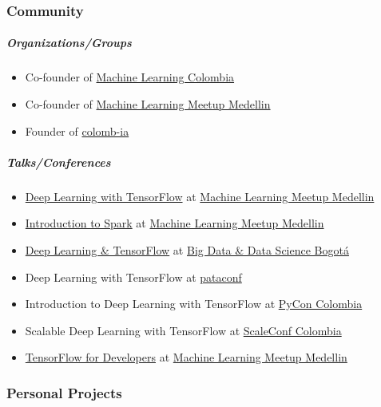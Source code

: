 \documentclass[]{article}
\begin{document}
\subsubsection{Community}\label{community}

\subparagraph{Organizations/Groups}\label{organizationsgroups}

\begin{itemize}
\itemsep1pt\parskip0pt
\item
  Co-founder of
  \href{https://www.facebook.com/groups/1766056600304468}{Machine
  Learning Colombia}
\item
  Co-founder of \href{https://www.meetup.com/es-ES/ml-medellin}{Machine
  Learning Meetup Medellin}
\item
  Founder of
  \href{https://github.com/colomb-ia/mision-vision}{colomb-ia}
\end{itemize}

\subparagraph{Talks/Conferences}\label{talksconferences}

\begin{itemize}
\itemsep1pt\parskip0pt
\item
  \href{https://www.meetup.com/es-ES/ml-medellin/events/231887878/}{Deep
  Learning with TensorFlow} at
  \href{https://www.meetup.com/es-ES/ml-medellin}{Machine Learning
  Meetup Medellin}
\item
  \href{https://www.meetup.com/es-ES/ml-medellin/events/232587669/}{Introduction
  to Spark} at \href{https://www.meetup.com/es-ES/ml-medellin}{Machine
  Learning Meetup Medellin}
\item
  \href{https://www.meetup.com/es-ES/Big-Data-Science-Bogota/events/233975872}{Deep
  Learning \& TensorFlow} at
  \href{https://www.meetup.com/es-ES/Big-Data-Science-Bogota/}{Big Data
  \& Data Science Bogotá}
\item
  Deep Learning with TensorFlow at \href{http://pataconf.com/}{pataconf}
\item
  Introduction to Deep Learning with TensorFlow at
  \href{http://www.pycon.co/}{PyCon Colombia}
\item
  Scalable Deep Learning with TensorFlow at
  \href{http://scaleconfco.com/}{ScaleConf Colombia}
\item
  \href{https://www.meetup.com/es-ES/ml-medellin/events/238072044/}{TensorFlow
  for Developers} at
  \href{https://www.meetup.com/es-ES/ml-medellin}{Machine Learning
  Meetup Medellin}
\end{itemize}

\subsubsection{Personal Projects}\label{personal-projects}
\end{document}
